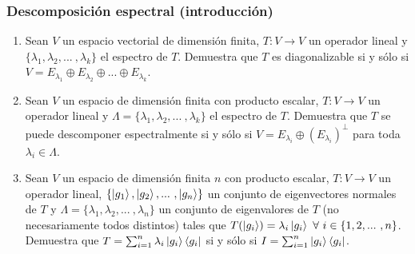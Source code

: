 \documentclass[12pt,dvipsnames]{article}
\begin{document}
\subsubsection{Descomposición espectral (introducción)} \label{Ejer:Descomposición espectral (introducción)}

\begin{enumerate}
\item Sean $V$ un espacio vectorial de dimensión finita, $T:V\to V$ un operador lineal y $\{\lambda_1,\lambda_2,... \ ,\lambda_k\}$ el espectro de $T$. Demuestra que $T$ es diagonalizable si y sólo si $V=E_{\lambda_1}\oplus E_{\lambda_2}\oplus...\oplus E_{\lambda_k}$.
\item Sean $V$ un espacio de dimensión finita con producto escalar, $T:V\to V$ un operador lineal y $\Lambda=\{\lambda_1,\lambda_2,... \ ,\lambda_k\}$ el espectro de $T$. Demuestra que $T$ se puede descomponer espectralmente si y sólo si $V = E_{\lambda_i} \oplus (E_{\lambda_i})^\perp$ para toda $\lambda_i\in\Lambda$.
\item Sean $V$ un espacio de dimensión finita $n$ con producto escalar, $T:V\to V$ un operador lineal, $\{\ket{g_1}, \ket{g_2}, ... \ ,\ket{g_n}\}$ un conjunto de eigenvectores normales de $T$ y $\Lambda=\{\lambda_1,\lambda_2,... \ ,\lambda_n\}$ un conjunto de eigenvalores de $T$ (no necesariamente todos distintos) tales que $T(\ket{g_i})=\lambda_i \ket{g_i} \ \forall \ i\in\{1,2,... \ ,n\}$. Demuestra que $T=\sum_{i=1}^n \lambda_i \ket{g_i}\bra{g_i}$ si y sólo si $I = \sum_{i=1}^n \ket{g_i}\bra{g_i}$.
\end{enumerate}
\end{document}

